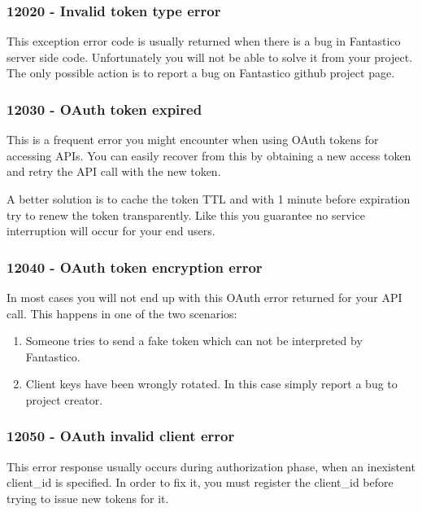 \documentclass[letterpaper,10pt,english]{sphinxmanual}
\begin{document}
\subsubsection{12020 - Invalid token type error}
\label{features/oauth2/exceptions/12020::doc}\label{features/oauth2/exceptions/12020:invalid-token-type-error}
This exception error code is usually returned when there is a bug in Fantastico server side code. Unfortunately you will not be
able to solve it from your project. The only possible action is to report a bug on Fantastico github project page.


\subsubsection{12030 - OAuth token expired}
\label{features/oauth2/exceptions/12030:oauth-token-expired}\label{features/oauth2/exceptions/12030::doc}
This is a frequent error you might encounter when using OAuth tokens for accessing APIs. You can easily recover from this
by obtaining a new access token and retry the API call with the new token.

A better solution is to cache the token TTL and with 1 minute before expiration try to renew the token transparently. Like this
you guarantee no service interruption will occur for your end users.


\subsubsection{12040 - OAuth token encryption error}
\label{features/oauth2/exceptions/12040:oauth-token-encryption-error}\label{features/oauth2/exceptions/12040::doc}
In most cases you will not end up with this OAuth error returned for your API call. This happens in one of the two scenarios:
\begin{enumerate}
\item {} 
Someone tries to send a fake token which can not be interpreted by Fantastico.

\item {} 
Client keys have been wrongly rotated. In this case simply report a bug to project creator.

\end{enumerate}


\subsubsection{12050 - OAuth invalid client error}
\label{features/oauth2/exceptions/12050:oauth-invalid-client-error}\label{features/oauth2/exceptions/12050::doc}
This error response usually occurs during authorization phase, when an inexistent client\_id is specified. In order to fix it,
you must register the client\_id before trying to issue new tokens for it.
\end{document}
